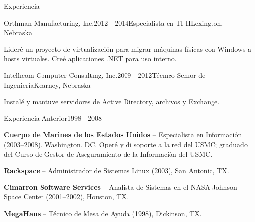 \documentclass{resume} %
\begin{document}
\begin{rSection}{Experiencia}
\begin{rSubsection}{Orthman Manufacturing, Inc.}{2012 - 2014}{Especialista en TI II}{Lexington, Nebraska}
\item Lider\'e un proyecto de virtualizaci\'on para migrar m\'aquinas f\'isicas con Windows a hosts virtuales. Cre\'e aplicaciones .NET para uso interno.
\end{rSubsection}

\begin{rSubsection}{Intellicom Computer Consulting, Inc.}{2009 - 2012}{T\'ecnico Senior de Ingenier\'ia}{Kearney, Nebraska}
\item Instal\'e y mantuve servidores de Active Directory, archivos y Exchange. 
\end{rSubsection}

\begin{rSubsection}{Experiencia Anterior}{1998 - 2008}{}{}
\item {\bf Cuerpo de Marines de los Estados Unidos} -- Especialista en Informaci\'on (2003--2008), Washington, DC. Oper\'e y di soporte a la red del USMC; graduado del Curso de Gestor de Aseguramiento de la Informaci\'on del USMC.
\item {\bf Rackspace} -- Administrador de Sistemas Linux (2003), San Antonio, TX.
\item {\bf Cimarron Software Services} -- Analista de Sistemas en el NASA Johnson Space Center (2001--2002), Houston, TX.
\item {\bf MegaHaus} -- T\'ecnico de Mesa de Ayuda (1998), Dickinson, TX.
\end{rSubsection}

\end{rSection}

\end{document}
